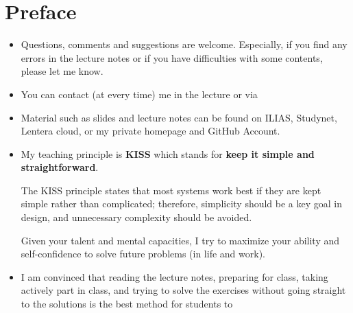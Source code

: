 
	\chapter*{Preface}

\begin{itemize}
	\item Questions, comments and suggestions are welcome. Especially, if you find any errors in the lecture notes or if you have difficulties with some contents, please let me know. 
	\item You can contact (at every time) me in the lecture or via 
	\item Material such as slides and lecture notes can be found on ILIAS, Studynet, Lentera cloud, or my private homepage and GitHub Account.
\pbn
	\item 	My teaching principle is \textbf{KISS} which stands for \textbf{keep it simple and straightforward}.

The KISS principle states that most systems work best if they are kept simple rather than complicated; therefore, simplicity should be a key goal in design, and unnecessary complexity should be avoided. 


Given your talent and mental capacities, I try to maximize your ability and self-confidence to solve future problems (in life and work).

\item 	I am convinced that reading the lecture notes, preparing for class, taking actively part in class, and trying to solve the exercises without going straight to the solutions is the best method for students to 
\end{itemize}
